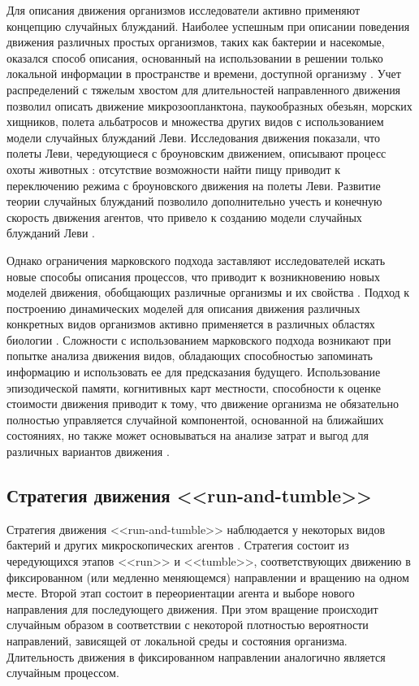 Для описания движения организмов исследователи активно применяют концепцию случайных блужданий. Наиболее успешным при описании поведения движения различных простых организмов, таких как бактерии и насекомые, оказался способ описания, основанный на использовании в решении только локальной информации в пространстве и времени, доступной организму \cite{turchin_quantitative_1998}. Учет распределений с тяжелым хвостом для длительностей направленного движения позволил описать движение микрозоопланктона, паукообразных обезьян, морских хищников, полета альбатросов и множества других видов \cite{boyer_modelling_2010} с использованием модели случайных блужданий Леви. Исследования движения показали, что полеты Леви, чередующиеся с броуновским движением, описывают процесс охоты животных \cite{sims_scaling_2008}: отсутствие возможности найти пищу приводит к переключению режима с броуновского движения на полеты Леви. Развитие теории случайных блужданий позволило дополнительно учесть и конечную скорость движения агентов, что привело к созданию модели случайных блужданий Леви \cite{shlesinger_random_1982}.   

Однако ограничения марковского подхода заставляют исследователей искать новые способы описания процессов, что приводит к возникновению новых моделей движения, обобщающих различные организмы и их свойства \cite{nathan_movement_2008}. Подход к построению динамических моделей для описания движения различных конкретных видов организмов активно применяется в различных областях биологии \cite{berg_random_1993}. Сложности с использованием марковского подхода возникают при попытке анализа движения видов, обладающих способностью запоминать информацию и использовать ее для предсказания будущего. Использование эпизодической памяти, когнитивных карт местности, способности к оценке стоимости движения приводит к тому, что движение организма не обязательно полностью управляется случайной компонентой, основанной на ближайших состояниях, но также может основываться на анализе затрат и выгод для различных вариантов движения \cite{boyer_modelling_2010}.

\subsection{Стратегия движения <<run-and-tumble>>}\label{subsec:ch1/sec1/sub2}

Стратегия движения <<run-and-tumble>> наблюдается у некоторых видов бактерий и других микроскопических агентов \cite{berg_coli_2004}. Стратегия состоит из чередующихся этапов <<run>> и <<tumble>>, соответствующих движению в фиксированном (или медленно меняющемся) направлении и вращению на одном месте. Второй этап состоит в переориентации агента и выборе нового направления для последующего движения. При этом вращение происходит случайным образом в соответствии с некоторой плотностью вероятности направлений, зависящей от локальной среды и состояния организма. Длительность движения в фиксированном направлении аналогично является случайным процессом. 

